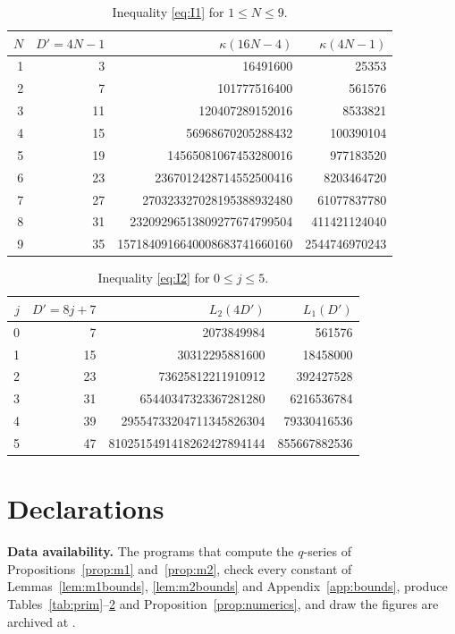 \documentclass[11pt]{amsart}
\theoremstyle{definition}
\begin{document}
\begin{table}[H]
\centering
\small
\begin{tabular}{rrrr}
\toprule
$N$ & $D'=4N-1$ & $\kappa(16N-4)$ & $\kappa(4N-1)$\\
\midrule
1 & 3 & 16491600 & 25353\\
2 & 7 & 101777516400 & 561576\\
3 & 11 & 120407289152016 & 8533821\\
4 & 15 & 56968670205288432 & 100390104\\
5 & 19 & 14565081067453280016 & 977183520\\
6 & 23 & 2367012428714552500416 & 8203464720\\
7 & 27 & 270323327028195388932480 & 61077837780\\
8 & 31 & 23209296513809277674799504 & 411421124040\\
9 & 35 & 1571840916640008683741660160 & 2544746970243\\
\bottomrule
\end{tabular}
\caption{Inequality \eqref{eq:I1} for $1\le N\le9$.}
\label{tab:I1}
\end{table}

\begin{table}[H]
\centering
\small
\begin{tabular}{rrrr}
\toprule
$j$ & $D'=8j+7$ & $L_2(4D')$ & $L_1(D')$\\
\midrule
0 & 7 & 2073849984 & 561576\\
1 & 15 & 30312295881600 & 18458000\\
2 & 23 & 73625812211910912 & 392427528\\
3 & 31 & 65440347323367281280 & 6216536784\\
4 & 39 & 29554733204711345826304 & 79330416536\\
5 & 47 & 8102515491418262427894144 & 855667882536\\
\bottomrule
\end{tabular}
\caption{Inequality \eqref{eq:I2} for $0\le j\le5$.}
\label{tab:I2}
\end{table}

\FloatBarrier
\section*{Declarations}

\noindent\textbf{Data availability.} The programs that compute the $q$-series of Propositions~\ref{prop:m1} and~\ref{prop:m2}, check every constant of Lemmas~\ref{lem:m1bounds}, \ref{lem:m2bounds} and Appendix~\ref{app:bounds}, produce Tables~\ref{tab:prim}--\ref{tab:I2} and Proposition~\ref{prop:numerics}, and draw the figures are archived at \cite{Bha26}.
\end{document}
